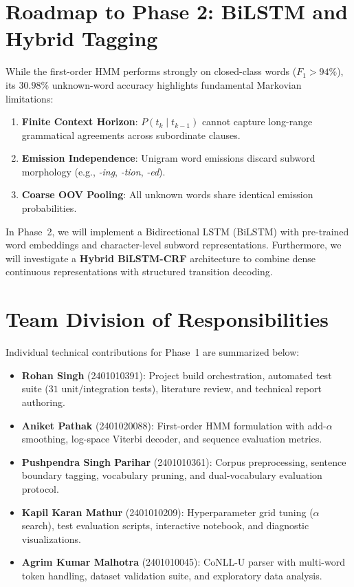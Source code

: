 \documentclass[conference]{IEEEtran}
\begin{document}
\section{Roadmap to Phase 2: BiLSTM and Hybrid Tagging}
While the first-order HMM performs strongly on closed-class words ($F_1 > 94\%$), its $30.98\%$ unknown-word accuracy highlights fundamental Markovian limitations:
\begin{enumerate}
    \item \textbf{Finite Context Horizon}: $P(t_k \mid t_{k-1})$ cannot capture long-range grammatical agreements across subordinate clauses.
    \item \textbf{Emission Independence}: Unigram word emissions discard subword morphology (e.g., \textit{-ing}, \textit{-tion}, \textit{-ed}).
    \item \textbf{Coarse OOV Pooling}: All unknown words share identical emission probabilities.
\end{enumerate}

In Phase~2, we will implement a Bidirectional LSTM (BiLSTM) with pre-trained word embeddings and character-level subword representations. Furthermore, we will investigate a \textbf{Hybrid BiLSTM-CRF} architecture to combine dense continuous representations with structured transition decoding.

\section{Team Division of Responsibilities}
Individual technical contributions for Phase~1 are summarized below:
\begin{itemize}
    \item \textbf{Rohan Singh} (2401010391): Project build orchestration, automated test suite ($31$ unit/integration tests), literature review, and technical report authoring.
    \item \textbf{Aniket Pathak} (2401020088): First-order HMM formulation with add-$\alpha$ smoothing, log-space Viterbi decoder, and sequence evaluation metrics.
    \item \textbf{Pushpendra Singh Parihar} (2401010361): Corpus preprocessing, sentence boundary tagging, vocabulary pruning, and dual-vocabulary evaluation protocol.
    \item \textbf{Kapil Karan Mathur} (2401010209): Hyperparameter grid tuning ($\alpha$ search), test evaluation scripts, interactive notebook, and diagnostic visualizations.
    \item \textbf{Agrim Kumar Malhotra} (2401010045): CoNLL-U parser with multi-word token handling, dataset validation suite, and exploratory data analysis.
\end{itemize}
\end{document}
